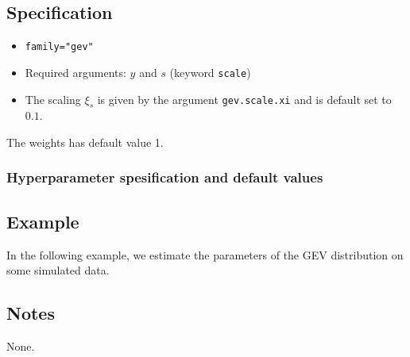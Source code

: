 \documentclass[a4paper,11pt]{article}
\begin{document}
\subsection*{Specification}

\begin{itemize}
\item \texttt{family="gev"}
\item Required arguments: $y$ and $s$ (keyword \texttt{scale})
\item The scaling $\xi_{s}$ is given by the argument
    \texttt{gev.scale.xi} and is default set to $0.1$.
\end{itemize}
The weights has default value 1.

\subsubsection*{Hyperparameter spesification and default values}


\subsection*{Example}

In the following example, we estimate the parameters of the GEV
distribution on some simulated data.


\subsection*{Notes}

None.
\end{document}

